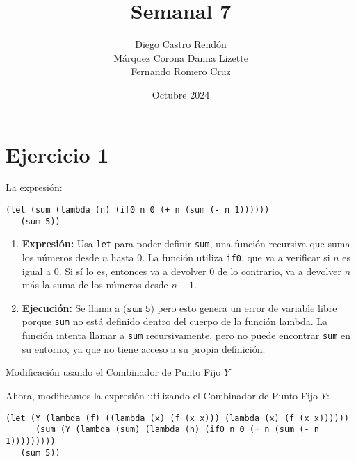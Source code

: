 \documentclass{article}
\title{Semanal 7}
\author{Diego Castro Rendón\\ Márquez Corona Danna Lizette\\ Fernando Romero Cruz}
\date{Octubre 2024}
\begin{document}
\maketitle

\section*{Ejercicio 1}

La expresión:

\begin{verbatim}
(let (sum (lambda (n) (if0 n 0 (+ n (sum (- n 1))))))
   (sum 5))
\end{verbatim}

\begin{enumerate}
    \item \textbf{Expresión:} 
    Usa \texttt{let} para poder definir \texttt{sum}, una función recursiva que suma los números desde \( n \) hasta \( 0 \). 
    La función utiliza \texttt{if0}, que va a verificar si \( n \) es igual a \( 0 \). Si sí lo es, entonces va a  devolver \( 0 \) de lo contrario, va a devolver \( n \) más la suma de los números desde \( n-1 \).

    \item \textbf{Ejecución:}
    Se llama a \( \texttt{(sum 5)} \) pero esto genera un error de variable libre porque \texttt{sum} no está definido dentro del cuerpo de la función lambda. 
    La función intenta llamar a \texttt{sum} recursivamente, pero no puede encontrar \texttt{sum} en su entorno, ya que no tiene acceso a su propia definición.
\end{enumerate}

Modificación usando el Combinador de Punto Fijo \( Y \)

Ahora, modificamos la expresión utilizando el Combinador de Punto Fijo \( Y \):

\begin{verbatim}
(let (Y (lambda (f) ((lambda (x) (f (x x))) (lambda (x) (f (x x))))))
      (sum (Y (lambda (sum) (lambda (n) (if0 n 0 (+ n (sum (- n 1)))))))))
   (sum 5))
\end{verbatim}
\end{document}
